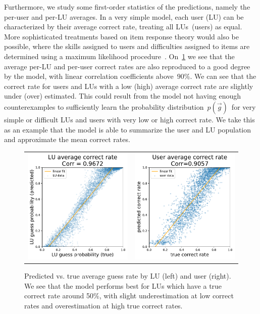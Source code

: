Furthermore, we study some first-order statistics of the predictions, namely the per-user and per-LU averages. In a very simple model, each user (LU) can be characterized by their average correct rate, treating all LUs (users) as equal. More sophisticated treatments based on item response theory would also be possible, where the skills assigned to users and difficulties assigned to items are determined using a maximum likelihood procedure~\cite{embretson2013item}. On~\cref{fig:user_lu_correct_rate} we see that the average per-LU and per-user correct rates are also reproduced to a good degree by the model, with linear correlation coefficients above~$90\%$. We can see that the correct rate for users and LUs with a low (high) average correct rate are slightly under (over) estimated. This could result from the model not having enough counterexamples to sufficiently learn the probability distribution~$p(\vec{g})$~for very simple or difficult LUs and users with very low or high correct rate. We take this as an example that the model is able to summarize the user and LU population and approximate the mean correct rates.

\begin{figure}[ht]
\centering
\begin{tabular}{cc}
\includegraphics[width=0.4\linewidth]{figures/lingvist/lu_correct_rate.pdf} &
\includegraphics[width=0.4\linewidth]{figures/lingvist/user_correct_rate.pdf} \\
\end{tabular}
\caption[Predicted vs. true average guess rate]{Predicted vs. true average guess rate by LU (left) and user (right). We see that the model performs best for LUs which have a true correct rate around 50\%, with slight underestimation at low correct rates and overestimation at high true correct rates.}
\label{fig:user_lu_correct_rate}
\end{figure}

